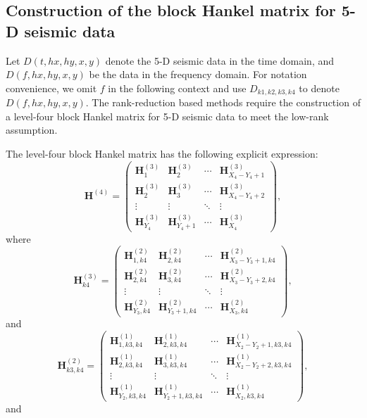 \subsection{Construction of the block Hankel matrix for 5-D seismic data}
Let $D(t,hx,hy,x,y)$ denote the 5-D seismic data in the time domain, and $D(f,hx,hy,x,y)$ be the data in the frequency domain. For notation convenience, we omit $f$ in the following context and use $D_{k1,k2,k3,k4}$ to denote $D(f,hx,hy,x,y)$. The  rank-reduction based methods require the construction of a level-four block Hankel matrix for 5-D seismic data to meet the low-rank assumption.  

The level-four block Hankel matrix has the following explicit expression:
\begin{equation}
\label{eq:levelfour}
\mathbf{H}^{(4)}=\left(\begin{array}{cccc}
\mathbf{H}_{1}^{(3)} & \mathbf{H}_{2}^{(3)} & \cdots & \mathbf{H}_{X_4-Y_4+1}^{(3)} \\
\mathbf{H}_{2}^{(3)} & \mathbf{H}_{3}^{(3)}  &\cdots & \mathbf{H}_{X_4-Y_4+2}^{(3)} \\
\vdots & \vdots &\ddots &\vdots \\
\mathbf{H}_{Y_4}^{(3)}&\mathbf{H}_{Y_4+1}^{(3)} &\cdots& \mathbf{H}_{X_4}^{(3)}
\end{array}
\right),
\end{equation}
where 
\begin{equation}
\label{eq:levelthree}
\mathbf{H}_{k4}^{(3)}=\left(\begin{array}{cccc}
\mathbf{H}_{1,k4}^{(2)} & \mathbf{H}_{2,k4}^{(2)} & \cdots &\mathbf{H}_{X_3-Y_3+1,k4}^{(2)} \\
\mathbf{H}_{2,k4}^{(2)} & \mathbf{H}_{3,k4}^{(2)}  &\cdots &\mathbf{H}_{X_3-Y_3+2,k4}^{(2)} \\
\vdots & \vdots &\ddots &\vdots \\
\mathbf{H}_{Y_3,k4}^{(2)}&\mathbf{H}_{Y_3+1,k4}^{(2)} &\cdots&\mathbf{H}_{X_3,k4}^{(2)}
\end{array}
\right),
\end{equation}
and 
\begin{equation}
\label{eq:leveltwo}
\mathbf{H}_{k3,k4}^{(2)}=\left(\begin{array}{cccc}
\mathbf{H}_{1,k3,k4}^{(1)} & \mathbf{H}_{2,k3,k4}^{(1)} & \cdots &\mathbf{H}_{X_2-Y_2+1,k3,k4}^{(1)} \\
\mathbf{H}_{2,k3,k4}^{(1)} & \mathbf{H}_{3,k3,k4}^{(1)}  &\cdots &\mathbf{H}_{X_2-Y_2+2,k3,k4}^{(1)} \\
\vdots & \vdots &\ddots &\vdots \\
\mathbf{H}_{Y_2,k3,k4}^{(1)}&\mathbf{H}_{Y_2+1,k3,k4}^{(1)} &\cdots&\mathbf{H}_{X_2,k3,k4}^{(1)}
\end{array}
\right),
\end{equation}
and

